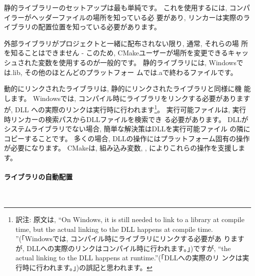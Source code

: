 \documentclass[uplatex,11pt,a4paper,landscape,dvipdfmx]{jsarticle} %
\newcommand{\sectiontitle}[1]{\paragraph{#1} \ \\} %
\begin{document}
\begin{multicols}{2}
静的ライブラリーのセットアップは最も単純です。
これを使用するには, コンパイラーがヘッダーファイルの場所を知っている必
要があり, リンカーは実際のライブラリの配置位置を知っている必要があります。

外部ライブラリがプロジェクトと一緒に配布されない限り, 通常, それらの場
所を知ることはできません - このため, CMakeユーザーが場所を変更できるキャッ
シュされた変数を使用するのが一般的です。
静的ライブラリには, Windowsでは.lib, その他のほとんどのプラットフォー
ムでは.aで終わるファイルです。




動的にリンクされたライブラリは, 静的にリンクされたライブラリと同様に機
能します。
Windowsでは, コンパイル時にライブラリをリンクする必要がありますが, DLL
への実際のリンクは実行時に行われます\footnote{訳注: 原文は, ``On
  Windows, it is still needed to link to a library at compile time,
  but the actual linking to the DLL happens at compile
  time. ''(「Windowsでは, コンパイル時にライブラリにリンクする必要があ
    りますが, DLLへの実際のリンクはコンパイル時に行われます。」)ですが,
  ``the actual linking to the DLL happens at runtime.''(「DLLへの実際のリ
  ンクは実行時に行われます。」)の誤記と思われます。}。
実行可能ファイルは, 実行時リンカーの検索パスからDLLファイルを検索でき
る必要があります。
DLLがシステムライブラリでない場合, 簡単な解決策はDLLを実行可能ファイル
の隣にコピーすることです。
多くの場合, DLLの操作にはプラットフォーム固有の操作が必要になります。
CMakeは, 組み込み変数, , 
によりこれらの操作を支援します。



\sectiontitle{ライブラリの自動配置}



\end{multicols}
\end{document}
